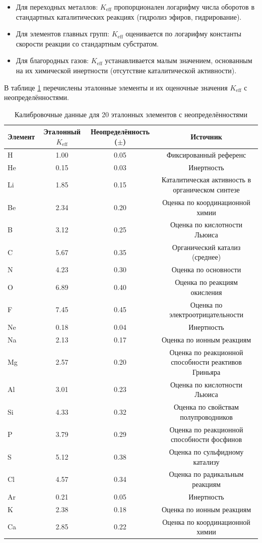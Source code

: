 \documentclass[12pt,a4paper]{article}
\theoremstyle{remark}
\newcommand{\Keff}{K_{\mathrm{eff}}}
\begin{document}
	\begin{itemize}
		\item Для переходных металлов: $\Keff$ пропорционален логарифму числа оборотов в стандартных каталитических реакциях (гидролиз эфиров, гидрирование).
		\item Для элементов главных групп: $\Keff$ оценивается по логарифму константы скорости реакции со стандартным субстратом.
		\item Для благородных газов: $\Keff$ устанавливается малым значением, основанным на их химической инертности (отсутствие каталитической активности).
	\end{itemize}
	
	В таблице \ref{tab:calibration} перечислены эталонные элементы и их оценочные значения $\Keff$ с неопределённостями.
	
	\begin{table}[htbp]
		\centering
		\caption{Калибровочные данные для 20 эталонных элементов с неопределённостями}
		\label{tab:calibration}
		\begin{tabular}{lccc}
			\toprule
			Элемент & Эталонный $\Keff$ & Неопределённость ($\pm$) & Источник \\
			\midrule
			H & 1.00 & 0.05 & Фиксированный референс \\
			He & 0.15 & 0.03 & Инертность \\
			Li & 1.85 & 0.15 & Каталитическая активность в органическом синтезе \\
			Be & 2.34 & 0.20 & Оценка по координационной химии \\
			B & 3.12 & 0.25 & Оценка по кислотности Льюиса \\
			C & 5.67 & 0.35 & Органический катализ (среднее) \\
			N & 4.23 & 0.30 & Оценка по основности \\
			O & 6.89 & 0.40 & Оценка по реакциям окисления \\
			F & 7.45 & 0.45 & Оценка по электроотрицательности \\
			Ne & 0.18 & 0.04 & Инертность \\
			Na & 2.13 & 0.17 & Оценка по ионным реакциям \\
			Mg & 2.57 & 0.20 & Оценка по реакционной способности реактивов Гриньяра \\
			Al & 3.01 & 0.23 & Оценка по кислотности Льюиса \\
			Si & 4.33 & 0.32 & Оценка по свойствам полупроводников \\
			P & 3.79 & 0.29 & Оценка по реакционной способности фосфинов \\
			S & 5.12 & 0.38 & Оценка по сульфидному катализу \\
			Cl & 4.57 & 0.34 & Оценка по радикальным реакциям \\
			Ar & 0.21 & 0.05 & Инертность \\
			K & 2.38 & 0.18 & Оценка по ионным реакциям \\
			Ca & 2.85 & 0.22 & Оценка по координационной химии \\
			\bottomrule
		\end{tabular}
	\end{table}
	
\end{document}
